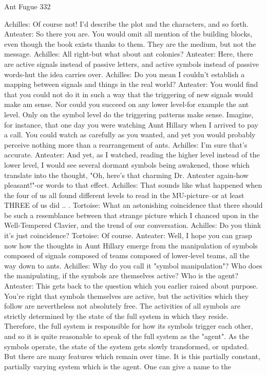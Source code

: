Ant Fugue                                                                                 332

Achilles: Of course not! I'd describe the plot and the characters, and so forth.
Anteater: So there you are. You would omit all mention of the building blocks, even
    though the book exists thanks to them. They are the medium, but not the message.
Achilles: All right-but what about ant colonies?
Anteater: Here, there are active signals instead of passive letters, and active symbols
    instead of passive words-hut the idea carries over.
Achilles: Do you mean I couldn't establish a mapping between signals and things in the
    real world?
Anteater: You would find that you could not do it in such a way that the triggering of new
    signals would make am sense. Nor could you succeed on any lower level-for example
    the ant level. Only on the symbol level do the triggering patterns make sense.
    Imagine, for instance, that one day you were watching Aunt Hillary when I arrived to
    pay a call. You could watch as carefully as you wanted, and yet you would probably
    perceive nothing more than a rearrangement of ants.
Achilles: I'm sure that's accurate.
Anteater: And yet, as I watched, reading the higher level instead of the lower level, I
    would see several dormant symbols being awakened, those which translate into the
    thought, "Oh, here's that charming Dr. Anteater again-how pleasant!"-or words to
    that effect.
Achilles: That sounds like what happened when the four of us all found different levels to
    read in the MU-picture--or at least THREE of us did .. .
Tortoise: What an astonishing coincidence that there should be such a resemblance
    between that strange picture which I chanced upon in the Well-Tempered Clavier,
    and the trend of our conversation.
Achilles: Do you think it's just coincidence?
Tortoise: Of course.
Anteater: Well, I hope you can grasp now how the thoughts in Aunt Hillary emerge from
    the manipulation of symbols composed of signals composed of teams composed of
    lower-level teams, all the way down to ants.
Achilles: Why do you call it "symbol manipulation"? Who does the manipulating, if the
    symbols are themselves active? Who is the agent?
Anteater: This gets back to the question which you earlier raised about purpose. You're
    right that symbols themselves are active, but the activities which they follow are
    nevertheless not absolutely free. The activities of all symbols are strictly determined
    by the state of the full system in which they reside. Therefore, the full system is
    responsible for how its symbols trigger each other, and so it is quite reasonable to
    speak of the full system as the "agent". As the symbols operate, the state of the
    system gets slowly transformed, or updated. But there are many features which
    remain over time. It is this partially constant, partially varying system which is the
    agent. One can give a name to the




